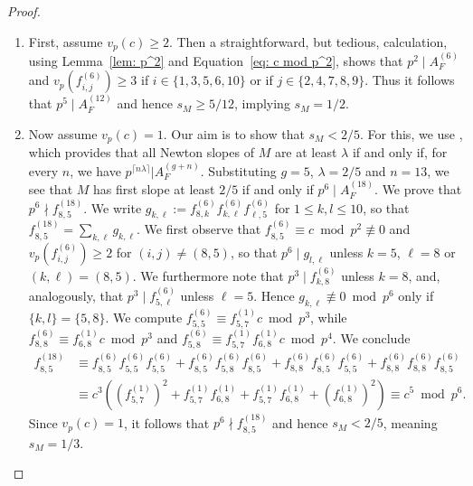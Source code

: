 \documentclass[11pt,table]{amsart}
\numberwithin{equation}{section}
\theoremstyle{definition}
\theoremstyle{remark}
\theoremstyle{remark}
\begin{document}
\begin{proof}
\begin{enumerate}
\item First, assume $v_p(c) \geq 2$. 
Then a straightforward, but tedious, calculation, using Lemma~\ref{lem: p^2} and Equation~\eqref{eq: c mod p^2}, shows that $p^2 \mid A_F^{(6)}$ and $v_p(f_{i,j}^{(6)}) \geq 3$ if $i\in \{1,3,5,6,10\}$ or if $j\in\{2,4,7,8,9\}$.
Thus it follows that $p^5 \mid A_F^{(12)}$ and hence $s_M\geq 5/12$, implying $s_M=1/2$.

\item Now assume $v_p(c)=1$. Our aim is to show that $s_M<2/5$. For this, we use \cite[1.5.1]{Katz}, which provides that all Newton slopes of $M$ are at least $\lambda$ if and only if, for every $n$, we have $p^{\lceil n\lambda \rceil} | A_{F}^{(g+n)}$. Substituting $g=5$, $\lambda=2/5$ and $n=13$, we see that $M$ has first slope at least $2/5$ if and only if $p^6 \mid A_F^{(18)}$. We prove that $p^6 \nmid f_{8,5}^{(18)}$. We write $g_{k,\ell}:=f_{8,k}^{(6)} f_{k,\ell}^{(6)}f_{\ell,5}^{(6)}$ for $1\leq k,l \leq 10$, so that $f_{8,5}^{(18)}= \sum_{k,\ell} g_{k,\ell}$. We first observe that $f_{8,5}^{(6)}\equiv c \bmod p^2 \not \equiv 0$ and $v_p(f_{i,j}^{(6)})\geq 2$ for $(i,j)\neq (8,5)$, so that $p^6 \mid g_{l,\ell}$ unless $k=5$, $\ell=8$ or $(k,\ell)=(8,5)$. We furthermore note that $p^3 \mid f_{k,8}^{(6)}$ unless $k=8$, and, analogously, that $p^3 \mid f_{5,\ell}^{(6)}$ unless $\ell=5$. Hence $g_{k,\ell} \not \equiv 0 \bmod p^6$ only if $\{k,l\}=\{5,8\}$. We compute $f_{5,5}^{(6)} \equiv f_{5,7}^{(1)}c \bmod p^3$, while $f_{8,8}^{(6)} \equiv f_{6,8}^{(1)}c \bmod p^3$ and $f_{5,8}^{(6)}\equiv f_{5,7}^{(1)}f_{6,8}^{(1)} c \bmod p^4.$ We conclude
\begin{align*}
f_{8,5}^{(18)}&\equiv  f_{8,5}^{(6)}f_{5,5}^{(6)}f_{5,5}^{(6)} + f_{8,5}^{(6)}f_{5,8}^{(6)}f_{8,5}^{(6)} + f_{8,8}^{(6)}f_{8,5}^{(6)}f_{5,5}^{(6)} + f_{8,8}^{(6)}f_{8,8}^{(6)}f_{8,5}^{(6)} \\
&\equiv c^3((f_{5,7}^{(1)})^2+f_{5,7}^{(1)}f_{6,8}^{(1)}+f_{5,7}^{(1)}f_{6,8}^{(1)}+(f_{6,8}^{(1)})^2) \equiv c^5 \bmod p^6.
\end{align*}
Since $v_p(c)=1$, it follows that $p^6 \nmid f_{8,5}^{(18)}$ and hence $s_M<2/5$, meaning $s_M=1/3$.



\end{enumerate}
\end{proof}
\end{document}
